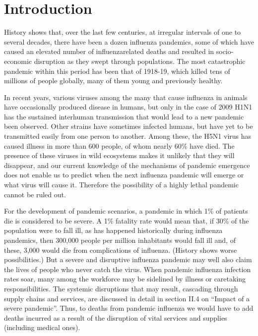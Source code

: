 \documentclass[12pt, a4]{scrartcl}
\begin{document}
\printindex

\newpage
\section{Introduction}
History shows that, over the last few centuries, at irregular intervals of one to several decades, there have been a dozen influenza pandemics, some of which have caused an elevated number of influenzarelated deaths and resulted in socio-economic disruption as they swept through populations. The most catastrophic pandemic within this period has been that of 1918-19, which killed tens of millions of people globally, many of them young and previously healthy.

In recent years, various viruses among the many that cause influenza in animals have occasionally produced disease in humans, but only in the case of 2009 H1N1 has the sustained interhuman transmission that would lead to a new pandemic been observed. Other strains have sometimes infected humans, but have yet to be transmitted easily from one person to another. Among these, the H5N1 virus has caused illness in more than 600 people, of whom nearly 60\% have died. The presence of these viruses in wild ecosystems makes it unlikely that they will disappear, and our current knowledge of the mechanisms of pandemic emergence does not enable us to predict when the next influenza pandemic will emerge or what virus will cause it. Therefore the possibility of a highly lethal pandemic cannot be ruled out.

For the development of pandemic scenarios, a pandemic in which 1\% of patients die is considered to be severe. A 1\% fatality rate would mean that, if 30\% of the population were to fall ill, as has happened historically during influenza pandemics, then 300,000 people per million inhabitants would fall ill and, of these, 3,000 would die from complications of influenza. (History shows worse possibilities.) But a severe and disruptive influenza pandemic may well also claim the lives of people who never catch the virus. When pandemic influenza infection rates soar, many among the workforce may be sidelined by illness or caretaking responsibilities. The systemic disruptions that may result, cascading through supply chains and services, are discussed in detail in section II.4 on “Impact of a severe pandemic”. Thus, to deaths from pandemic influenza we would have to add deaths incurred as a result of the disruption of vital services and supplies (including medical ones).
\end{document}
